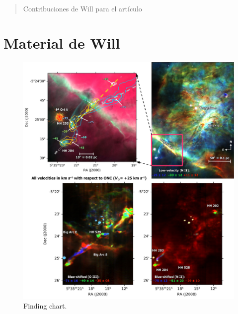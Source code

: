 \documentclass[twocolumn]{aastex63}
\begin{document}
\begin{abstract}

Contribuciones de Will para el artículo

\end{abstract}


\section{Material de Will}
\label{sec:will}

\newcommand\ha{\ensuremath{\mathrm{H\alpha}}}
\newcommand\hb{\ensuremath{\mathrm{H\beta}}}
\renewcommand{\ion}[2]{\setcounter{ionstage}{#2}%
  \ensuremath{\mathrm{#1\,\scriptstyle\Roman{ionstage}}}}
\newcommand\oiii{[\ion{O}{3}]}
\newcommand\wav[1]{\ensuremath{\lambda #1}}
\newcommand\Te{\ensuremath{T_{\mathrm{e}}}}
\newcommand\BG{\ensuremath{_{\mathrm{BG}}}}
\def\th#1#2{\ensuremath{\theta^{#1}\,\text{Ori~#2}}}

\begin{figure}
  \centering
  \includegraphics[width=\textwidth]{hh204-finding-chart}
  \caption{Finding chart.}
  \label{fig:hh204-finding-chart}
\end{figure}
\end{document}
